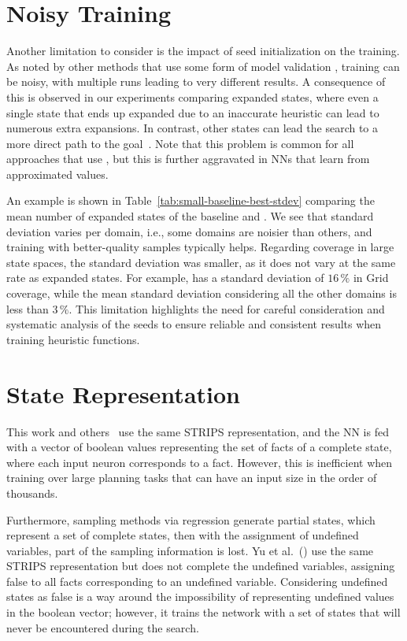 \section{Noisy Training}

Another limitation to consider is the impact of seed initialization on the training. As noted by other methods that use some form of model validation \cite{Ferber.etal/2020a, Shen.etal/2020, Ferber.etal/2022, OToole/2022}, training can be noisy, with multiple runs leading to very different results. A consequence of this is observed in our experiments comparing expanded states, where even a single state that ends up expanded due to an inaccurate heuristic can lead to numerous extra expansions. In contrast, other states can lead the search to a more direct path to the goal~\cite{Heusner.etal/2017}. Note that this problem is common for all approaches that use \gbfs, but this is further aggravated in NNs that learn from approximated values.



An example is shown in Table~\ref{tab:small-baseline-best-stdev} comparing the mean number of expanded states of the baseline and \hnnrs. We see that standard deviation varies per domain, i.e., some domains are noisier than others, and training with better-quality samples typically helps. Regarding coverage in large state spaces, the standard deviation was smaller, as it does not vary at the same rate as expanded states. For example, \hnnrs has a standard deviation of $16\,\%$ in Grid coverage, while the mean standard deviation considering all the other domains is less than $3\,\%$. This limitation highlights the need for careful consideration and systematic analysis of the seeds to ensure reliable and consistent results when training heuristic functions.

\section{State Representation}

This work and others~\cite{Ferber.etal/2020a, Ferber.etal/2022, OToole/2022} use the same STRIPS representation, and the NN is fed with a vector of boolean values representing the set of facts of a complete state, where each input neuron corresponds to a fact. However, this is inefficient when training over large planning tasks that can have an input size in the order of thousands.

Furthermore, sampling methods via regression generate partial states, which represent a set of complete states, then with the assignment of undefined variables, part of the sampling information is lost. Yu et al.~(\citeyear{Yu.etal/2020}) use the same STRIPS representation but does not complete the undefined variables, assigning false to all facts corresponding to an undefined variable. Considering undefined states as false is a way around the impossibility of representing undefined values in the boolean vector; however, it trains the network with a set of states that will never be encountered during the search.

